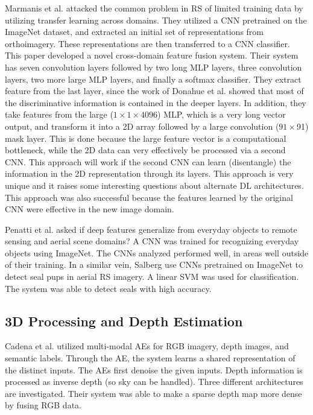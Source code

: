\documentclass[12pt]{spieman}
\begin{document}
\begin{spacing}{1}
Marmanis et al. \cite{marmanis2016deep} attacked the common problem in RS of limited training data by utilizing transfer learning across domains. They utilized a CNN pretrained on the ImageNet dataset, and extracted an initial set of representations from orthoimagery. These representations are then transferred to a CNN classifier. This paper developed a novel cross-domain feature fusion system. Their system has seven convolution layers followed by two long MLP layers, three convolution layers, two more large MLP layers, and finally a softmax classifier. They extract feature from the last layer, since the work of Donahue et al. \cite{Donahue2014DeCAF} showed that most of the discriminative information is contained in the deeper layers. In addition, they take features from the large ($1 \times 1 \times 4096$) MLP, which is a very long vector output, and transform it into a 2D array followed by a large convolution ($91 \times $91) mask layer. This is done because the large feature vector is a computational bottleneck, while the 2D data can very effectively be processed via a second CNN. This approach will work if the second CNN can learn (disentangle) the information in the 2D representation through its layers. This approach is very unique and it raises some interesting questions about alternate DL architectures. This approach was also successful because the features learned by the original CNN were effective in the new image domain.

Penatti et al. \cite{Penatti2015Deep} asked if deep features generalize from everyday objects to remote sensing and aerial scene domains? A CNN was trained for recognizing everyday objects using ImageNet. The CNNs analyzed performed well, in areas well outside of their training. In a similar vein, Salberg \cite{Salberg2015} use CNNs pretrained on ImageNet to detect seal pups in aerial RS imagery. A linear SVM was used for classification. The system was able to detect seals with high accuracy.

\subsection{3D Processing and Depth Estimation}

Cadena et al. \cite{Cadena2016} utilized multi-modal AEs for RGB imagery, depth images, and semantic labels. Through the AE, the system learns a shared representation of the distinct inputs. The AEs first denoise the given inputs. Depth information is processed as inverse depth (so sky can be handled). Three different architectures are investigated. Their system was able to make a sparse depth map more dense by fusing RGB data.


\end{spacing}
\end{document}
